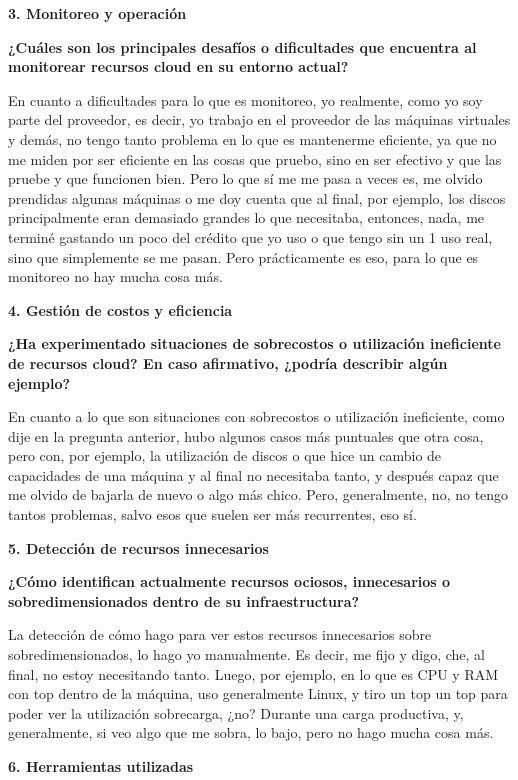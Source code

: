 \textbf{3. Monitoreo y operación}

\textbf{¿Cuáles son los principales desafíos o dificultades que encuentra al monitorear recursos cloud en su entorno actual?}

En cuanto a dificultades para lo que es monitoreo, yo realmente, como yo soy parte del proveedor, es decir, yo trabajo en el proveedor de las máquinas virtuales y demás, no tengo tanto problema en lo que es mantenerme eficiente, ya que no me miden por ser eficiente en las cosas que pruebo, sino en ser efectivo y que las pruebe y que funcionen bien. Pero lo que sí me me pasa a veces es, me olvido prendidas algunas máquinas o me doy cuenta que al final, por ejemplo, los discos principalmente eran demasiado grandes lo que necesitaba, entonces, nada, me terminé gastando un poco del crédito que yo uso o que tengo sin un 1 uso real, sino que simplemente se me pasan. Pero prácticamente es eso, para lo que es monitoreo no hay mucha cosa más.

\textbf{4. Gestión de costos y eficiencia}

\textbf{¿Ha experimentado situaciones de sobrecostos o utilización ineficiente de recursos cloud? En caso afirmativo, ¿podría describir algún ejemplo?}

En cuanto a lo que son situaciones con sobrecostos o utilización ineficiente, como dije en la pregunta anterior, hubo algunos casos más puntuales que otra cosa, pero con, por ejemplo, la utilización de discos o que hice un cambio de capacidades de una máquina y al final no necesitaba tanto, y después capaz que me olvido de bajarla de nuevo o algo más chico. Pero, generalmente, no, no tengo tantos problemas, salvo esos que suelen ser más recurrentes, eso sí.

\textbf{5. Detección de recursos innecesarios}

\textbf{¿Cómo identifican actualmente recursos ociosos, innecesarios o sobredimensionados dentro de su infraestructura?}

La detección de cómo hago para ver estos recursos innecesarios sobre sobredimensionados, lo hago yo manualmente. Es decir, me fijo y digo, che, al final, no estoy necesitando tanto. Luego, por ejemplo, en lo que es CPU y RAM con top dentro de la máquina, uso generalmente Linux, y tiro un top un top para poder ver la utilización sobrecarga, ¿no? Durante una carga productiva, y, generalmente, si veo algo que me sobra, lo bajo, pero no hago mucha cosa más.

\textbf{6. Herramientas utilizadas}

